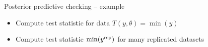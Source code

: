 \documentclass[t]{beamer}
\begin{document}
\begin{frame}[fragile]

  {\Large\color{navyblue} Posterior predictive checking -- example}

  \begin{itemize}
  \item<1-> Compute test statistic for data $T(y,\theta)=\min(y)$
  \item<2-> Compute test statistic $\min(y^{\rm rep})$ for many replicated datasets 
  \end{itemize}
  \vspace{-1.5\baselineskip}

\end{frame}
\end{document}
